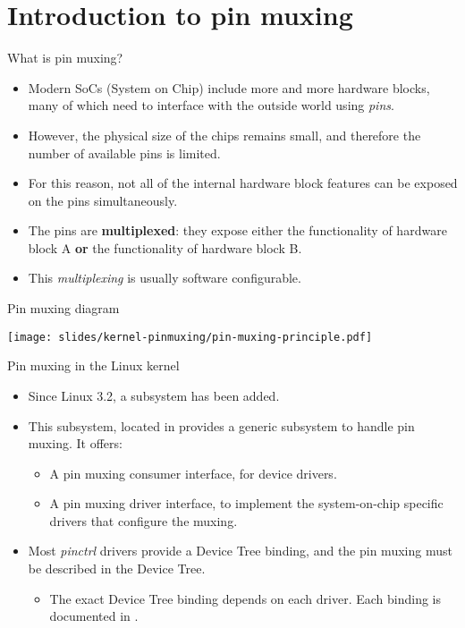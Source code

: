 \section{Introduction to pin muxing}

\begin{frame}{What is pin muxing?}
  \begin{itemize}
  \item Modern SoCs (System on Chip) include more and more hardware
    blocks, many of which need to interface with the outside world
    using {\em pins}.
  \item However, the physical size of the chips remains small, and
    therefore the number of available pins is limited.
  \item For this reason, not all of the internal hardware block
    features can be exposed on the pins simultaneously.
  \item The pins are {\bf multiplexed}: they expose either the
    functionality of hardware block A {\bf or} the functionality of
    hardware block B.
  \item This {\em multiplexing} is usually software configurable.
  \end{itemize}
\end{frame}

\begin{frame}{Pin muxing diagram}
  \begin{center}
    \texttt{[image: slides/kernel-pinmuxing/pin-muxing-principle.pdf]}
  \end{center}
\end{frame}

\begin{frame}{Pin muxing in the Linux kernel}
  \begin{itemize}
  \item Since Linux 3.2, a  subsystem has been added.
  \item This subsystem, located in  provides a
    generic subsystem to handle pin muxing. It offers:
    \begin{itemize}
    \item A pin muxing consumer interface, for device drivers.
    \item A pin muxing driver interface, to implement the system-on-chip
      specific drivers that configure the muxing.
    \end{itemize}
  \item Most {\em pinctrl} drivers provide a Device Tree binding, and
    the pin muxing must be described in the Device Tree.
    \begin{itemize}
    \item The exact Device Tree binding depends on each driver. Each
      binding is documented in
      .
    \end{itemize}
  \end{itemize}
\end{frame}

